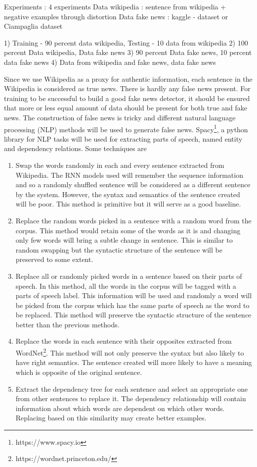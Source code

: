 \documentclass[a4paper, 11pt]{article}
\begin{document}
Experiments : 4 experiments 
Data wikipedia : sentence from wikipedia + negative examples through distortion
Data fake news : kaggle - dataset or Ciampaglia dataset

1) Training - 90 percent data wikipedia, Testing - 10 data from wikipedia
2) 100 percent Data wikipedia, Data fake news
3) 90 percent Data fake news, 10 percent data fake news
4) Data from wikipedia and fake news, data fake news

Since we use Wikipedia as a proxy for authentic information, each sentence in the Wikipedia is considered as true news. There is hardly any false news present. For training to be successful to build a good fake news detector, it should be ensured that more or less equal amount of data should be present for both true and fake news. The construction of false news is tricky and different natural language processing (NLP) methods will be used to generate false news. Spacy\footnote{https://www.spacy.io}, a python library for NLP tasks will be used for extracting parts of speech, named entity and dependency relations. Some techniques are 
\begin{enumerate}
\item Swap the words randomly in each and every sentence extracted from Wikipedia. The RNN models used will remember the sequence information and so a randomly shuffled sentence will be considered as a different sentence by the system. However, the syntax and semantics of the sentence created will be poor. This method is primitive but it will serve as a good baseline. 
\item Replace the random words picked in a sentence with a random word from the corpus. This method would retain some of the words as it is and changing only few words will bring a subtle change in sentence. This is similar to random swapping but the syntactic structure of the sentence will be preserved to some extent.
\item Replace all or randomly picked words in a sentence based on their parts of speech. In this method, all the words in the corpus will be tagged with a parts of speech label. This information will be used and randomly a word will be picked from the corpus which has the same parts of speech as the word to be replaced. This method will preserve the syntactic structure of the sentence better than the previous methods. 
\item Replace the words in each sentence with their opposites extracted from WordNet\footnote{https://wordnet.princeton.edu/}. This method will not only preserve the syntax but also likely to have right semantics. The sentence created will more likely to have a meaning which is opposite of the original sentence. 
\item Extract the dependency tree for each sentence and select an appropriate one from other sentences to replace it. The dependency relationship will contain information about which words are dependent on which other words. Replacing based on this similarity may create better examples.
\end{enumerate}
\end{document}
